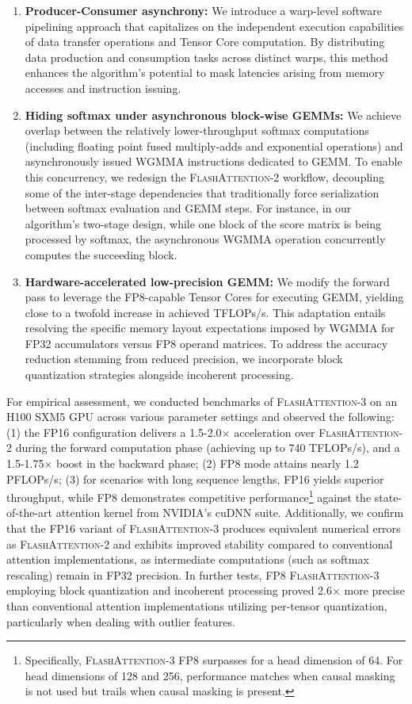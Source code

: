 \begin{enumerate}

\item \textbf{Producer-Consumer asynchrony:} We introduce a warp-level software pipelining approach that capitalizes on the independent execution capabilities of data transfer operations and Tensor Core computation. By distributing data production and consumption tasks across distinct warps, this method enhances the algorithm’s potential to mask latencies arising from memory accesses and instruction issuing.
\item \textbf{Hiding softmax under asynchronous block-wise GEMMs:} We achieve overlap between the relatively lower-throughput softmax computations (including floating point fused multiply-adds and exponential operations) and asynchronously issued WGMMA instructions dedicated to GEMM. To enable this concurrency, we redesign the \textsc{FlashAttention-2} workflow, decoupling some of the inter-stage dependencies that traditionally force serialization between softmax evaluation and GEMM steps. For instance, in our algorithm’s two-stage design, while one block of the score matrix is being processed by softmax, the asynchronous WGMMA operation concurrently computes the succeeding block.
\item \textbf{Hardware-accelerated low-precision GEMM:} We modify the forward pass to leverage the FP8-capable Tensor Cores for executing GEMM, yielding close to a twofold increase in achieved TFLOPs/s. This adaptation entails resolving the specific memory layout expectations imposed by WGMMA for FP32 accumulators versus FP8 operand matrices. To address the accuracy reduction stemming from reduced precision, we incorporate block quantization strategies alongside incoherent processing.
\end{enumerate}

For empirical assessment, we conducted benchmarks of \textsc{FlashAttention-3} on an H100 SXM5 GPU across various parameter settings and observed the following: (1) the FP16 configuration delivers a 1.5-2.0$\times$ acceleration over \textsc{FlashAttention-2} during the forward computation phase (achieving up to 740 TFLOPs/s), and a 1.5-1.75$\times$ boost in the backward phase; (2) FP8 mode attains nearly 1.2 PFLOPs/s; (3) for scenarios with long sequence lengths, FP16 yields superior throughput, while FP8 demonstrates competitive performance\footnote{Specifically, \textsc{FlashAttention-3} FP8 surpasses for a head dimension of 64. For head dimensions of 128 and 256, performance matches when causal masking is not used but trails when causal masking is present.} against the state-of-the-art attention kernel from NVIDIA’s cuDNN suite. Additionally, we confirm that the FP16 variant of \textsc{FlashAttention-3} produces equivalent numerical errors as \textsc{FlashAttention-2} and exhibits improved stability compared to conventional attention implementations, as intermediate computations (such as softmax rescaling) remain in FP32 precision. In further tests, FP8 \textsc{FlashAttention-3} employing block quantization and incoherent processing proved 2.6$\times$ more precise than conventional attention implementations utilizing per-tensor quantization, particularly when dealing with outlier features.

